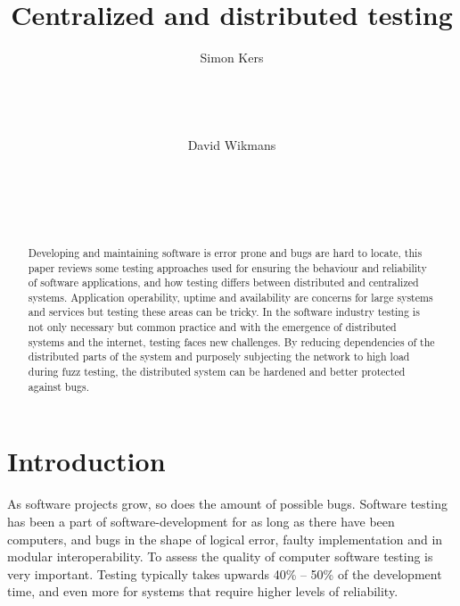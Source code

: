 \documentclass[10pt]{sensys-abstract}
\author{
%
\alignauthor Simon Kers\\
   \email{\url{skers@kth.se}}\\
   \affaddr{School of Technology and Health}\\
   \affaddr{KTH Royal Institute of Technology}\\
   \affaddr{March 2013}\\
\alignauthor David Wikmans\\
   \email{\url{wikmans@kth.se}}\\
   \affaddr{School of Technology and Health}\\
   \affaddr{KTH Royal Institute of Technology}\\
   \affaddr{March 2013}\\
}
\title{Centralized and distributed testing}
\begin{document}
\maketitle

\begin{abstract}
\noindent
Developing and maintaining software is error prone and bugs are hard to locate, this paper reviews some testing approaches used for ensuring the behaviour and reliability of software applications, and how testing differs between distributed and centralized systems.
Application operability, uptime and availability are concerns for large systems and services but testing these areas can be tricky.
In the software industry testing is not only necessary but common practice and with the emergence of distributed systems and the internet, testing faces new challenges.
By reducing dependencies of the distributed parts of the system and purposely subjecting the network to high load during fuzz testing, the distributed system can be hardened and better protected against bugs.

\end{abstract}




\section{Introduction}
  \label{sec:intro}
\noindent
As software projects grow, so does the amount of possible bugs.
Software testing has been a part of software-development for as long as there have been computers, and bugs in the shape of logical error, faulty implementation and in modular interoperability. To assess the quality of computer software testing is very important. Testing typically takes upwards 40\% -- 50\% of the development time, and even more for systems that require higher levels of reliability. \cite{testing_techniques}
\end{document}
